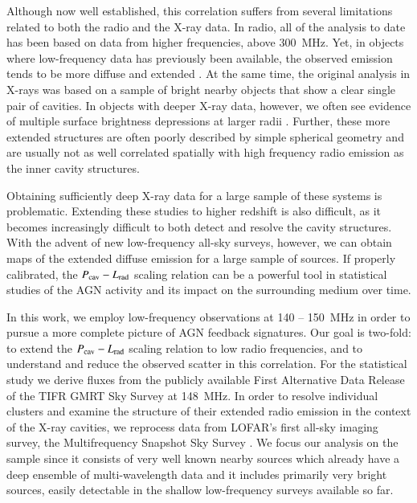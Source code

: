 \documentclass{aa}  %
\begin{document}
Although now well established, this correlation suffers from several limitations related to both the radio and the X-ray data.
In radio, all of the analysis to date has been based on data from higher frequencies, above 300~MHz.
Yet, in objects where low-frequency data has previously been available, the observed emission tends to be more diffuse and extended \citep[e.g.][]{Lane2004}.
At the same time, the original analysis in X-rays was based on a sample of bright nearby objects that show a clear single pair of cavities.
In objects with deeper X-ray data, however, we often see evidence of multiple surface brightness depressions at larger radii \citep[Table 3 in][]{Vantyghem2014}.
Further, these more extended structures  are often poorly described by simple spherical geometry and are usually not as well correlated spatially with high frequency radio emission as the inner cavity structures.

Obtaining sufficiently deep X-ray data for a large sample of these systems is problematic. 
Extending these studies to higher redshift is also difficult, as it becomes increasingly difficult to both detect and resolve the cavity structures.
With the advent of new low-frequency all-sky surveys, however, we can obtain maps of the extended diffuse emission for a large sample of sources.
If properly calibrated, the $P_{\rm cav} - L_{\rm{rad}}$ scaling relation can be a powerful tool in statistical studies of the AGN activity and its impact on the surrounding medium over time.

In this work, we employ low-frequency observations at 140 -- 150~MHz in order to pursue a more complete picture of AGN feedback signatures.
Our goal is two-fold: to extend the $P_{\rm cav} - L_{\rm{rad}}$ scaling relation to low radio frequencies, and to understand and reduce the observed scatter in this correlation.
For the statistical study we derive fluxes from the publicly available First Alternative Data Release of the TIFR GMRT Sky Survey \citep[TGSS ADR1;][hereafter TGSS]{Intema2017} at 148~MHz. 
In order to resolve individual clusters and examine the structure of their extended radio emission in the context of the X-ray cavities, we reprocess data from LOFAR’s first all-sky imaging survey, the Multifrequency Snapshot Sky Survey \citep[MSSS;][]{Heald2015}.
We focus our analysis on the \cite{Birzan2008} sample since it consists of very well known nearby sources which already have a deep ensemble of multi-wavelength data
and it includes primarily very bright sources, easily detectable in the shallow low-frequency surveys available so far.
\end{document}
